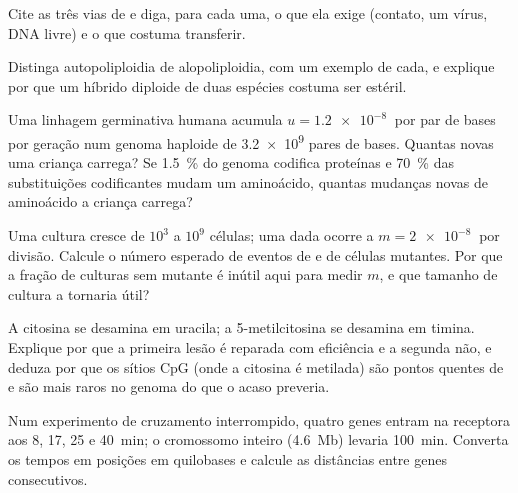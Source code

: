 \begin{exercise}[$\star$]\label{exo:b2:genome-diversification:3}
Cite as três vias de  e diga, para
cada uma, o que ela exige (contato, um vírus, DNA livre) e o que
costuma transferir.
\end{exercise}

\begin{exercise}[$\star$]\label{exo:b2:genome-diversification:4}
Distinga autopoliploidia de alopoliploidia, com um exemplo de cada, e
explique por que um híbrido diploide de duas espécies costuma ser
estéril.
\end{exercise}

\begin{exercise}[$\star\star$]\label{exo:b2:genome-diversification:5}
Uma linhagem germinativa humana acumula $u = \qty{1.2e-8}{}$ 
por par de bases por geração num genoma haploide de \qty{3.2e9}{}
pares de bases. Quantas  novas uma criança carrega? Se
\qty{1.5}{\%} do genoma codifica proteínas e \qty{70}{\%} das
substituições codificantes mudam um aminoácido, quantas mudanças novas
de aminoácido a criança carrega?
\end{exercise}

\begin{exercise}[$\star\star$]\label{exo:b2:genome-diversification:6}
Uma cultura cresce de $10^{3}$ a $10^{9}$ células; uma dada 
ocorre a $m = \qty{2e-8}{}$ por divisão. Calcule o número esperado de
eventos de  e de células mutantes. Por que a fração de culturas
sem mutante é inútil aqui para medir $m$, e que tamanho de cultura a
tornaria útil?
\end{exercise}

\begin{exercise}[$\star\star$]\label{exo:b2:genome-diversification:7}
A citosina se desamina em uracila; a 5-metilcitosina se desamina em
timina. Explique por que a primeira lesão é reparada com eficiência e
a segunda não, e deduza por que os sítios CpG (onde a citosina é
metilada) são pontos quentes de  e são mais raros no genoma do
que o acaso preveria.
\end{exercise}

\begin{exercise}[$\star\star$]\label{exo:b2:genome-diversification:8}
Num experimento de cruzamento interrompido, quatro genes entram na
receptora aos 8, 17, 25 e \qty{40}{min}; o cromossomo inteiro
(\qty{4.6}{Mb}) levaria \qty{100}{min}. Converta os tempos em posições
em quilobases e calcule as distâncias entre genes consecutivos.
\end{exercise}

